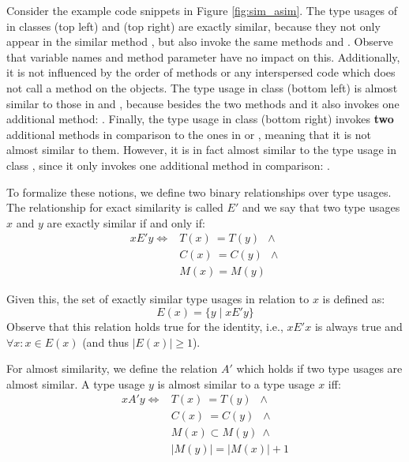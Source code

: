Consider the example code snippets in Figure \ref{fig:sim_asim}.
The type usages of  in classes  (top left) and  (top right) are exactly similar, because they not only appear in the similar method , but also invoke the same methods  and .
Observe that variable names and method parameter have no impact on this.
Additionally, it is not influenced by the order of methods or any interspersed code which does not call a method on the  objects.
The type usage in class  (bottom left) is almost similar to those in  and , because besides the two methods  and  it also invokes one additional method: .
Finally, the type usage in class  (bottom right) invokes \textbf{two} additional methods in comparison to the ones in  or , meaning that it is not almost similar to them.
However, it is in fact almost similar to the type usage in class , since it only invokes one additional method in comparison: .

To formalize these notions, we define two binary relationships over type usages.
The relationship for exact similarity is called $E'$ and we say that two type usages $x$ and $y$ are exactly similar if and only if:
\begin{align*}
xE'y \iff & T(x) \: = T(y) \;\: \land \\
         & C(x) \: = C(y) \;\: \land \\
         & M(x) = M(y)
\end{align*}

Given this, the set of exactly similar type usages in relation to $x$ is defined as:
\begin{equation*}
E(x) = \{y \mid xE'y \}
\end{equation*}
Observe that this relation holds true for the identity, i.e., $xE'x$ is always true and $\forall x: x \in E(x)$ (and thus $|E(x)| \geq 1$).

For almost similarity, we define the relation $A'$ which holds if two type usages are almost similar.
A type usage $y$ is almost similar to a type usage $x$ iff:
\begin{align*}
xA'y \iff & T(x) \: = T(y) \;\; \land \\
         & C(x) \: = C(y) \;\; \land \\
         & M(x) \subset M(y) \: \land \\
         & |M(y)| = |M(x)| + 1
\end{align*}


